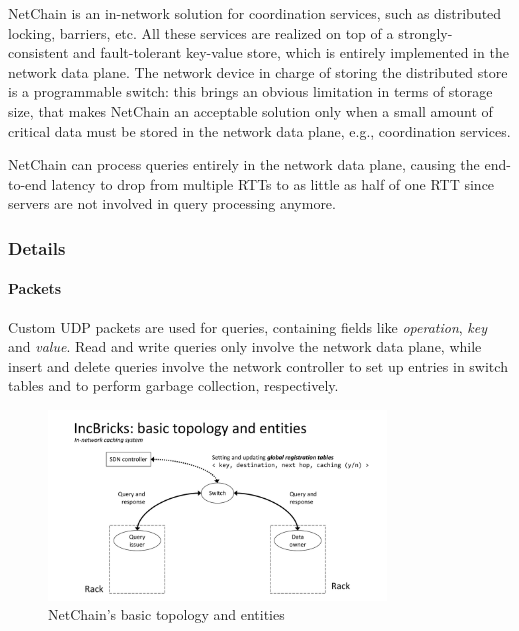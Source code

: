 NetChain \cite{netchain} is an in-network solution for coordination services, such as distributed locking, barriers, etc.
All these services are realized on top of a strongly-consistent and fault-tolerant key-value store, which is entirely implemented in the network data plane.
The network device in charge of storing the distributed store is a programmable switch: this brings an obvious limitation in terms of storage size, that makes NetChain \cite{netchain} an acceptable solution only when a small amount of critical data must be stored in the network data plane, e.g., coordination services.\par
NetChain \cite{netchain} can process queries entirely in the network data plane, causing the end-to-end latency to drop from multiple RTTs to as little as half of one RTT since servers are not involved in query processing anymore.

\subsubsection{Details}
\paragraph{Packets}
Custom UDP packets are used for queries, containing fields like \textit{operation}, \textit{key} and \textit{value}.
Read and write queries only involve the network data plane, while insert and delete queries involve the network controller to set up entries in switch tables and to perform garbage collection, respectively.

\begin{figure}[!htb]
    \centering
        \includegraphics[page=5, clip, trim=3.6cm 0.7cm 10cm 4.15cm, width=0.8\textwidth]{figures/analysis/inp/solutions.pdf}
    \caption{NetChain's \texorpdfstring{\cite{netchain}}{} basic topology and entities}
\end{figure}

